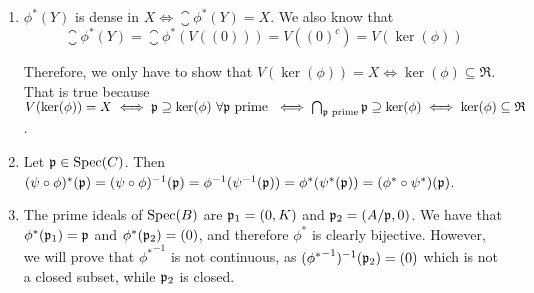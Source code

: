 \begin{sol}
\begin{enumerate}[label=(\roman*)]
		\item $\phi^*(Y)$ is dense in $X \iff \closure{\phi^*(Y)} = X$. We also know that
		\[
			\closure{\phi^*(Y)} = \closure{\phi^*(V((0)))} = V((0)^c) = V(\ker(\phi))
		\]

		Therefore, we only have to show that $V(\ker(\phi)) = X \iff \ker(\phi) \subseteq \mathfrak{R}$. That is true because $V(\ker(\phi)) = X \iff \mathfrak{p} \supseteq \ker(\phi) \, \, \forall \mathfrak{p} \text{ prime } \iff \bigcap_{\mathfrak{p} \text{ prime}} \mathfrak{p} \supseteq \ker(\phi) \iff \ker(\phi) \subseteq \mathfrak{R}$.

		\item Let $\mathfrak{p} \in \text{Spec}(C)$. Then $(\psi \circ \phi)^*(\mathfrak{p}) = (\psi \circ \phi)^{-1}(\mathfrak{p}) = \phi^{-1}(\psi^{-1}(\mathfrak{p})) = \phi^*(\psi^{*}(\mathfrak{p})) = (\phi^* \circ \psi^*)(\mathfrak{p})$.

		\item The prime ideals of $\text{Spec}(B)$ are $\mathfrak{p}_1 = (0,K)$ and $\mathfrak{p}_2 = (A/\mathfrak{p}, 0)$. We have that $\phi^*(\mathfrak{p}_1) = \mathfrak{p}$ and $\phi^*(\mathfrak{p}_2) = (0)$, and therefore $\phi^*$ is clearly bijective. However, we will prove that ${\phi^*}^{-1}$ is not continuous, as $({\phi^*}^{-1})^{-1}(\mathfrak{p}_2) = (0)$ which is not a closed subset, while $\mathfrak{p}_2$ is closed.
	\end{enumerate}
\end{sol}